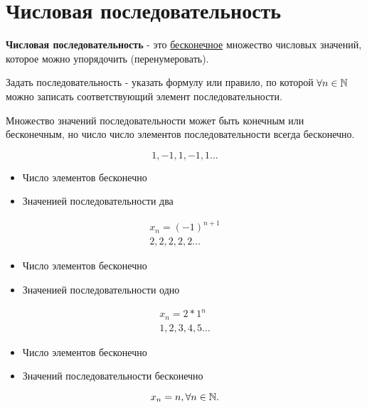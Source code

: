 \section{Числовая последовательность}

\begin{definition}
  \textbf{Числовая последовательность} - это \underline{бесконечное} множество числовых значений, которое можно упорядочить (перенумеровать).
\end{definition}

Задать последовательность - указать формулу или правило, по которой $\forall n\in \mathbb{N}$ можно записать соответствующий элемент последовательности.

\begin{note}
  Множество значений последовательности может быть конечным или бесконечным, но число число элементов последовательности всегда бесконечно.
\end{note}

\begin{eg}
  \[
  1, -1, 1, -1, 1\ldots
  \]
  \begin{itemize}
    \item Число элементов бесконечно
    \item Значенией последовательности два
  \end{itemize}
\end{eg}
\begin{eg}
  \begin{gather*}
    x_n = (-1)^{n+1} \\
    2, 2, 2, 2, 2\ldots
  \end{gather*}
  \begin{itemize}
    \item Число элементов бесконечно
    \item Значенией последовательности одно
  \end{itemize}
\end{eg}
\begin{eg}
  \begin{gather*}
    x_{n} = 2*1^{n} \\
    1, 2, 3, 4, 5\ldots
  \end{gather*}
  \begin{itemize}
    \item Число элементов бесконечно
    \item Значений последовательности бесконечно
  \end{itemize}
  \[
    x_{n} = n, \forall n\in \mathbb{N}
  .\] 
\end{eg}

